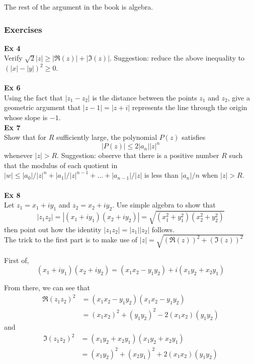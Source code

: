 The rest of the argument in the book is algebra.

\subsubsection{Exercises}

\textbf{Ex 4}
\\
Verify $\sqrt{2}|z| \geq |\Re(z)| + |\Im(z)|$.
Suggestion: reduce the above inequality to $(|x| - |y|)^2 \geq 0$.
\\~\\


\textbf{Ex 6}
\\
Using the fact that $|z_1 - z_2|$ is the distance between the points $z_1$ and $z_2$,
give a geometric argument that $|z - 1| = |z + i|$ represents the line through the origin
whose slope is $-1$.
\\

\textbf{Ex 7}
\\
Show that for $R$ sufficiently large, the polynomial $P(z)$ satisfies
$$
|P(z)| \leq 2 |a_n||z|^n
$$
whenever $|z| > R$.
Suggestion: observe that there is a positive number $R$ such that the modulus
of each quotient in $|w| \leq |a_0|/|z|^n + |a_1|/|z|^{n-1} + \ldots + |a_{n-1}|/|z|$
is less than $|a_n|/n$ when $|z| > R$.
\\~\\

\textbf{Ex 8}
\\
Let $z_1 = x_1 + iy_1$ and $z_2 = x_2 + iy_2$.
Use simple algebra to show that
$$
|z_1 z_2| = |(x_1 + iy_1) (x_2 + iy_2)| = \sqrt{ (x_{1}^{2} + y_{1}^{2}) (x_{2}^{2} + y_{2}^{2}) }
$$
then point out how the identity $|z_1 z_2| = |z_1| |z_2|$ follows.
\\

The trick to the first part is to make use of
$|z| = \sqrt{ (\Re(z))^2 + (\Im(z))^2 }$ 

First of,
$$
(x_1 + iy_1) (x_2 + iy_2) = (x_1 x_2 - y_1 y_2) + i (x_1 y_2 + x_2 y_1)
$$

From there, we can see that
\begin{align*}
\Re(z_1 z_2)^2 &= (x_1 x_2 - y_1 y_2) (x_1 x_2 - y_1 y_2) \\
&= (x_1 x_2)^2 + (y_1 y_2)^2 - 2(x_1 x_2)(y_1 y_2)
\end{align*}
and
\begin{align*}
\Im(z_1 z_2)^2 &= (x_1 y_2 + x_2 y_1) (x_1 y_2 + x_2 y_1) \\
&= (x_1 y_2)^2 + (x_2 y_1)^2 + 2(x_1 x_2)(y_1 y_2)
\end{align*}

